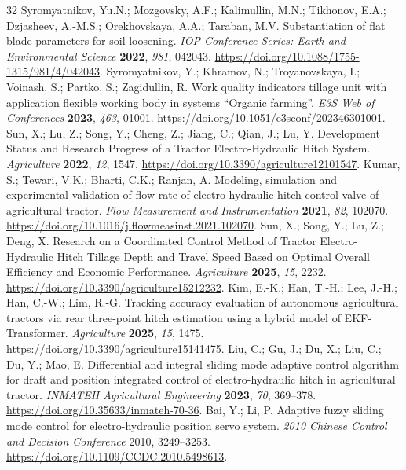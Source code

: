 \begin{thebibliography}{32}
 Syromyatnikov, Yu.N.; Mozgovsky, A.F.; Kalimullin, M.N.; Tikhonov, E.A.; Dzjasheev, A.-M.S.; Orekhovskaya, A.A.; Taraban, M.V. Substantiation of flat blade parameters for soil loosening. \emph{IOP Conference Series: Earth and Environmental Science} \textbf{2022}, \emph{981}, 042043. \url{https://doi.org/10.1088/1755-1315/981/4/042043}.
 Syromyatnikov, Y.; Khramov, N.; Troyanovskaya, I.; Voinash, S.; Partko, S.; Zagidullin, R. Work quality indicators tillage unit with application flexible working body in systems ``Organic farming''. \emph{E3S Web of Conferences} \textbf{2023}, \emph{463}, 01001. \url{https://doi.org/10.1051/e3sconf/202346301001}.
 Sun, X.; Lu, Z.; Song, Y.; Cheng, Z.; Jiang, C.; Qian, J.; Lu, Y. Development Status and Research Progress of a Tractor Electro-Hydraulic Hitch System. \emph{Agriculture} \textbf{2022}, \emph{12}, 1547. \url{https://doi.org/10.3390/agriculture12101547}.
 Kumar, S.; Tewari, V.K.; Bharti, C.K.; Ranjan, A. Modeling, simulation and experimental validation of flow rate of electro-hydraulic hitch control valve of agricultural tractor. \emph{Flow Measurement and Instrumentation} \textbf{2021}, \emph{82}, 102070. \url{https://doi.org/10.1016/j.flowmeasinst.2021.102070}.
 Sun, X.; Song, Y.; Lu, Z.; Deng, X. Research on a Coordinated Control Method of Tractor Electro-Hydraulic Hitch Tillage Depth and Travel Speed Based on Optimal Overall Efficiency and Economic Performance. \emph{Agriculture} \textbf{2025}, \emph{15}, 2232. \url{https://doi.org/10.3390/agriculture15212232}.
 Kim, E.-K.; Han, T.-H.; Lee, J.-H.; Han, C.-W.; Lim, R.-G. Tracking accuracy evaluation of autonomous agricultural tractors via rear three-point hitch estimation using a hybrid model of EKF-Transformer. \emph{Agriculture} \textbf{2025}, \emph{15}, 1475. \url{https://doi.org/10.3390/agriculture15141475}.
 Liu, C.; Gu, J.; Du, X.; Liu, C.; Du, Y.; Mao, E. Differential and integral sliding mode adaptive control algorithm for draft and position integrated control of electro-hydraulic hitch in agricultural tractor. \emph{INMATEH Agricultural Engineering} \textbf{2023}, \emph{70}, 369--378. \url{https://doi.org/10.35633/inmateh-70-36}.
 Bai, Y.; Li, P. Adaptive fuzzy sliding mode control for electro-hydraulic position servo system. \emph{2010 Chinese Control and Decision Conference} 2010, 3249--3253. \url{https://doi.org/10.1109/CCDC.2010.5498613}.

\end{thebibliography}
